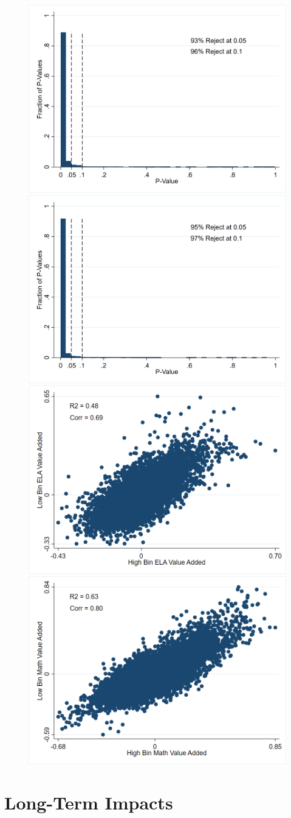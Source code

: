 \documentclass[12pt]{article}
\theoremstyle{definition}
\theoremstyle{definition}
\theoremstyle{definition}
\theoremstyle{definition}
\begin{document}
 \begin{figure}[H]
    \centering
    \includegraphics[width=.45\textwidth]{Working_Paper/WP_Figures/ELA_T_Test_Hist.png}
    \includegraphics[width=.45\textwidth]{Working_Paper/WP_Figures/Math_T_Test_Hist.png}
      \includegraphics[width=.45\textwidth]{Working_Paper/WP_Figures/ELA_High_Bin_Versus_Low_Bin.png}
    \includegraphics[width=.45\textwidth]{Working_Paper/WP_Figures/Math_High_Bin_Versus_Low_Bin.png}
        \caption{}
        \label{fig:t_tests}
\end{figure}

  
    
\section{Long-Term Impacts} \label{long}
\end{document}
